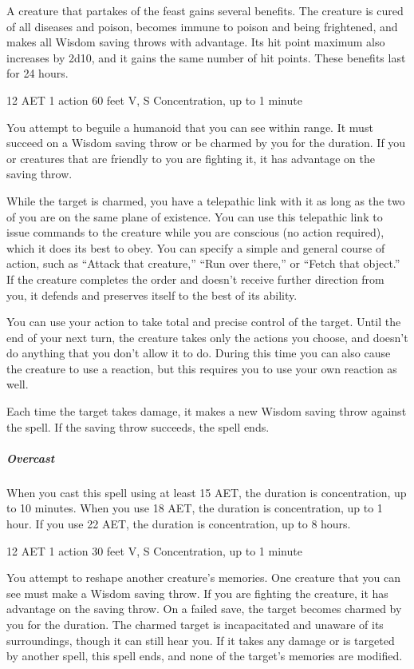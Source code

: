 A creature that partakes of the feast gains several benefits. The creature is cured of all diseases and poison, becomes immune to poison and being frightened, and makes all Wisdom saving throws with advantage. Its hit point maximum also increases by 2d10, and it gains the same number of hit points. These benefits last for 24 hours.

\label{spell:dominate-person}
{12 AET}
{1 action}
{60 feet}
{V, S}
{Concentration, up to 1 minute}

You attempt to beguile a humanoid that you can see within range. It must succeed on a Wisdom saving throw or be charmed by you for the duration. If you or creatures that are friendly to you are fighting it, it has advantage on the saving throw.

While the target is charmed, you have a telepathic link with it as long as the two of you are on the same plane of existence. You can use this telepathic link to issue commands to the creature while you are conscious (no action required), which it does its best to obey. You can specify a simple and general course of action, such as “Attack that creature,” “Run over there,” or “Fetch that object.” If the creature completes the order and doesn't receive further direction from you, it defends and preserves itself to the best of its ability.

You can use your action to take total and precise control of the target. Until the end of your next turn, the creature takes only the actions you choose, and doesn't do anything that you don't allow it to do. During this time you can also cause the creature to use a reaction, but this requires you to use your own reaction as well.

Each time the target takes damage, it makes a new Wisdom saving throw against the spell. If the saving throw succeeds, the spell ends.

\subparagraph*{Overcast} When you cast this spell using at least 15 AET, the duration is concentration, up to 10 minutes. When you use 18 AET, the duration is concentration, up to 1 hour. If you use 22 AET, the duration is concentration, up to 8 hours.

\label{spell:modify-memory}
{12 AET}
{1 action}
{30 feet}
{V, S}
{Concentration, up to 1 minute}

You attempt to reshape another creature's memories. One creature that you can see must make a Wisdom saving throw. If you are fighting the creature, it has advantage on the saving throw. On a failed save, the target becomes charmed by you for the duration. The charmed target is incapacitated and unaware of its surroundings, though it can still hear you. If it takes any damage or is targeted by another spell, this spell ends, and none of the target's memories are modified.

